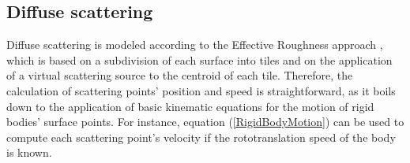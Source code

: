 \subsection{Diffuse scattering}
Diffuse scattering is modeled according to the Effective Roughness approach \cite{vitucci2019}, which is based on a subdivision of each surface into tiles and on the application of a virtual scattering source to the centroid of each tile. Therefore, the  calculation of scattering points' position and speed is straightforward, as it boils down to the application of basic kinematic equations for the motion of rigid bodies' surface points. For instance, equation (\ref{RigidBodyMotion}) can be used to compute each scattering point's velocity if the rototranslation speed of the body is known.

